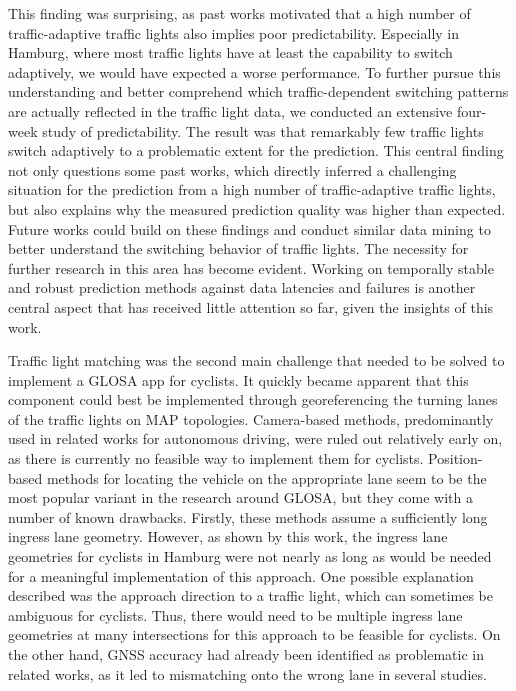 This finding was surprising, as past works motivated that a high number of traffic-adaptive traffic lights also implies poor predictability. Especially in Hamburg, where most traffic lights have at least the capability to switch adaptively, we would have expected a worse performance. To further pursue this understanding and better comprehend which traffic-dependent switching patterns are actually reflected in the traffic light data, we conducted an extensive four-week study of predictability. The result was that remarkably few traffic lights switch adaptively to a problematic extent for the prediction. This central finding not only questions some past works, which directly inferred a challenging situation for the prediction from a high number of traffic-adaptive traffic lights, but also explains why the measured prediction quality was higher than expected. Future works could build on these findings and conduct similar data mining to better understand the switching behavior of traffic lights. The necessity for further research in this area has become evident. Working on temporally stable and robust prediction methods against data latencies and failures is another central aspect that has received little attention so far, given the insights of this work.

Traffic light matching was the second main challenge that needed to be solved to implement a GLOSA app for cyclists. It quickly became apparent that this component could best be implemented through georeferencing the turning lanes of the traffic lights on MAP topologies. Camera-based methods, predominantly used in related works for autonomous driving, were ruled out relatively early on, as there is currently no feasible way to implement them for cyclists. Position-based methods for locating the vehicle on the appropriate lane seem to be the most popular variant in the research around GLOSA, but they come with a number of known drawbacks. Firstly, these methods assume a sufficiently long ingress lane geometry. However, as shown by this work, the ingress lane geometries for cyclists in Hamburg were not nearly as long as would be needed for a meaningful implementation of this approach. One possible explanation described was the approach direction to a traffic light, which can sometimes be ambiguous for cyclists. Thus, there would need to be multiple ingress lane geometries at many intersections for this approach to be feasible for cyclists. On the other hand, GNSS accuracy had already been identified as problematic in related works, as it led to mismatching onto the wrong lane in several studies.

